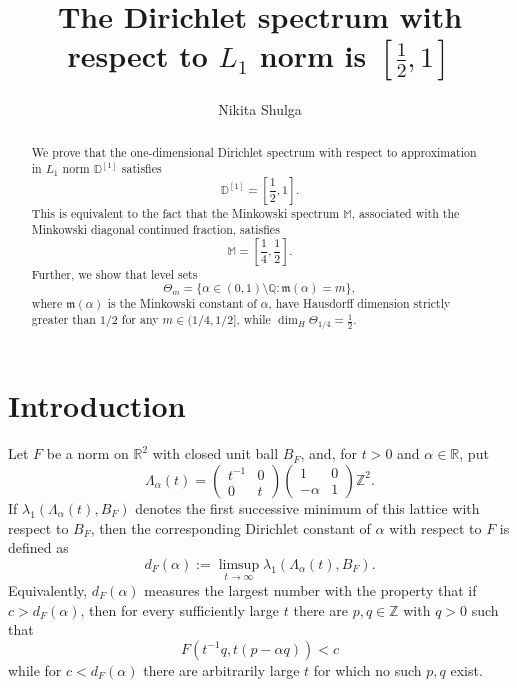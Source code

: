 \documentclass[11pt]{amsart}
\title{The Dirichlet spectrum with respect to $L_1$ norm is $\left[\frac12,1\right]$}
\author[Nikita Shulga]{Nikita Shulga}
\newcommand{\R}{\mathbb R}
\newcommand{\Q}{\mathbb Q}
\newcommand{\MS}{\mathbb M}
\begin{document}
\begin{abstract}
We prove that the one-dimensional Dirichlet spectrum with respect to approximation in $L_1$ norm $\mathbb{D}^{[1]}$ satisfies
$$
\mathbb{D}^{[1]}=\left[\frac12,1\right].
$$
This is equivalent to the fact that the Minkowski spectrum $\MS$, associated with the Minkowski diagonal continued fraction, satisfies
$$
        \MS=\left[\frac14,\frac12\right].
$$ 
Further, we show that level sets 
$$
        \Theta_m=\{\alpha\in(0,1)\setminus\Q:\mathfrak m(\alpha)=m\},
$$
where $\mathfrak{m}(\alpha)$ is the Minkowski constant of $\alpha$, have Hausdorff dimension strictly greater than $1/2$ for any $m\in(1/4,1/2]$, while $\dim_H \Theta_{1/4}=\frac{1}{2}$.

\end{abstract}

\maketitle



\section{Introduction}
Let $F$ be a norm on $\R^2$ with closed unit ball $B_F$, and, for $t>0$ and $\alpha\in\R$, put
$$
        \Lambda_\alpha(t)
        =
        \begin{pmatrix} t^{-1} & 0 \\ 0 & t \end{pmatrix}
        \begin{pmatrix} 1 & 0 \\ -\alpha & 1 \end{pmatrix}\mathbb Z^2.
$$
If $\lambda_1(\Lambda_\alpha(t),B_F)$ denotes the first successive
minimum of this lattice with respect to $B_F$, then the corresponding
Dirichlet constant of $\alpha$ with respect to $F$ is defined as
$$
        d_F(\alpha)
        :=\limsup_{t\to\infty}\lambda_1(\Lambda_\alpha(t),B_F).
$$
Equivalently, $d_F(\alpha)$ measures the largest number with the property that if $c > d_F(\alpha)$, then for every sufficiently large $t$ there are $p, q \in\mathbb Z$ with $q > 0$ such that
\begin{equation}\label{ineq:norm}
 F(t^{-1}q,t(p-\alpha q)) <c
\end{equation}
while for $c < d_F (\alpha)$ there are arbitrarily large $t$ for which no such $p, q$ exist.  
\end{document}
